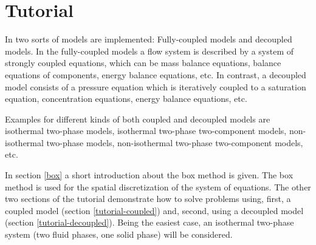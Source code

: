 \chapter[Tutorial]{Tutorial}\label{chp:tutorial}

In \Dumux two sorts of models are implemented: Fully-coupled models and decoupled models. In the fully-coupled models a flow system is described by a system of strongly coupled equations, which can be mass balance equations, balance equations of components, energy balance equations, etc. In contrast, a decoupled model consists of a pressure equation which is iteratively coupled to a saturation equation, concentration equations, energy balance equations, etc.

Examples for different kinds of both coupled and decoupled models are isothermal two-phase models, isothermal two-phase two-component models, non-isothermal two-phase models, non-isothermal two-phase two-component models, etc.

In section \ref{box} a short introduction about the box method is given. The box method is used for the spatial discretization of the system of equations. The other two sections of the tutorial demonstrate how to solve problems using, first, a coupled model (section \ref{tutorial-coupled}) and, second, using a decoupled model (section \ref{tutorial-decoupled}). Being the easiest case, an isothermal two-phase system (two fluid phases, one solid phase) will be considered.


%
